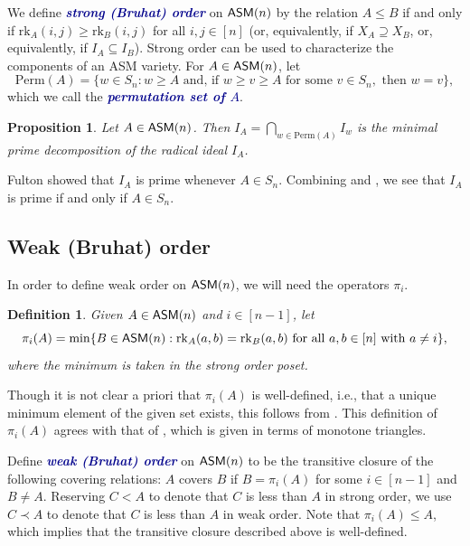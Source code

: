 \documentclass[12 pt]{amsart}
\newcommand{\newword}[1]{\textcolor{darkblue}{\textbf{\emph{#1}}}}
\newtheorem{definition}[Theorem]{Definition}
\newtheorem{proposition}[Theorem]{Proposition}
\numberwithin{equation}{section}
\newcommand{\rk}{\mathrm{rk}}
\newcommand{\perm}{\mathrm{Perm}}
\theoremstyle{remark}
\newcommand{\asm}{{\sf ASM}}
\begin{document}
We define \newword{strong (Bruhat) order} on $\asm(n)$ by the relation $A \leq B$ if and only if $\rk_A(i,j)\geq \rk_B(i,j)$ for all $i,j\in [n]$ (or, equivalently, if $X_A\supseteq X_B$, or, equivalently, if $I_A\subseteq I_B$).  Strong order can be used to characterize the components of an ASM variety. For $A \in \asm(n)$, let \[
\perm(A)= \{w\in S_n: w\ge A \text{ and, if } w\ge v\ge A \text{ for some } v\in S_n,\text{ then }w=v\},
\] which we call the \newword{permutation set of $A$}.

\begin{proposition}\cite[Proposition 5.4]{Wei17}\label{prop:I_A-intersection-of-schubs-in-perm}
Let $A \in \asm(n)$.  Then $I_A = \bigcap_{w \in \perm(A)} I_w$ is the minimal prime decomposition of the radical ideal $I_A$.
\end{proposition}

Fulton \cite[Theorem 3.3]{Ful92} showed that $I_A$ is prime whenever $A \in S_n$.  Combining \cite[Proposition 5.4]{Wei17} and \cite[Theorem 3.3]{Ful92}, we see that $I_A$ is prime if and only if $A \in S_n$. 


\subsection{Weak (Bruhat) order}
In order to define weak order on $\asm(n)$, we will need the operators $\pi_i$.  

\begin{definition}
\label{def:pi_i}
    Given $A\in \asm(n)$ and $i\in[n-1]$, let 
    \[
    \pi_i(A)=\min\{B\in \asm(n):\rk_A(a,b)=\rk_B(a,b) \text{ for all } a,b\in [n] \text{ with } a\neq i\},
\] where the minimum is taken in the strong order poset.
\end{definition}

Though it is not clear a priori that $\pi_i(A)$ is well-defined, i.e., that a unique minimum element of the given set exists, this follows from \cite[Lemma 2.9]{EKW-main}.  This definition of $\pi_i(A)$ agrees with that of \cite{HR20}, which is given in terms of monotone triangles.

Define \newword{weak (Bruhat) order} on $\asm(n)$ to be the transitive closure of the following covering relations: $A$ covers $B$ if $B = \pi_i(A)$ for some $i \in [n-1]$ and $B \neq A$.  Reserving $C <A$ to denote that $C$ is less than $A$ in strong order, we use $C \prec A$ to denote that $C$ is less than $A$ in weak order.  Note that $\pi_i(A) \leq A$, which implies that the transitive closure described above is well-defined.
\end{document}
